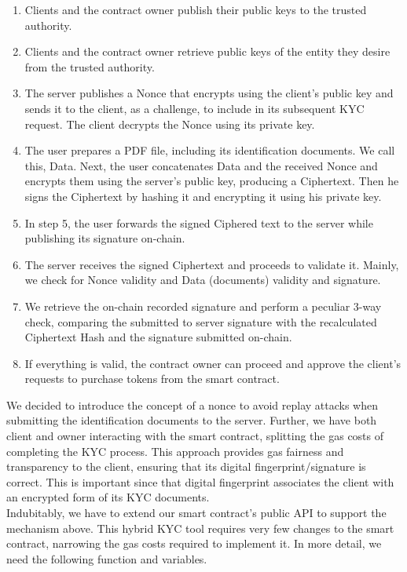 \documentclass[12pt,a4paper]{article}
\begin{document}
\begin{enumerate}
    \item Clients and the contract owner publish their public keys to the trusted authority.
    \item Clients and the contract owner retrieve public keys of the entity they
    desire from the trusted authority.
    \item The server publishes a Nonce that encrypts using the client's public
    key and sends it to the client, as a challenge, to include in its subsequent
    KYC request. The client decrypts the Nonce using its private key.
    \item The user prepares a PDF file, including its identification documents.
    We call this, Data. Next, the user concatenates Data and the received Nonce
    and encrypts them using the server's public key, producing a Ciphertext.
    Then he signs the Ciphertext by hashing it and encrypting it using his
    private key.
    \item In step 5, the user forwards the signed Ciphered text to the server
    while publishing its signature on-chain.
    \item The server receives the signed Ciphertext and proceeds to validate it.
    Mainly, we check for Nonce validity and Data (documents) validity and
    signature.
    \item We retrieve the on-chain recorded signature and perform a peculiar
    3-way check, comparing the submitted to server signature with the
    recalculated Ciphertext Hash and the signature submitted on-chain.
    \item If everything is valid, the contract owner can proceed and approve the
    client's requests to purchase tokens from the smart contract. 
\end{enumerate}

We decided to introduce the concept of a nonce to avoid replay attacks when
submitting the identification documents to the server. Further, we have both
client and owner interacting with the smart contract, splitting the gas costs of
completing the KYC process. This approach provides gas fairness and transparency
to the client, ensuring that its digital fingerprint/signature is correct. This
is important since that digital fingerprint associates the client with an
encrypted form of its KYC documents.\\

Indubitably, we have to extend our smart contract's public  API to support the
mechanism above. This hybrid KYC tool requires very few changes to the smart
contract, narrowing the gas costs required to implement it. In more detail, we
need the following function and variables.\\
\end{document}
